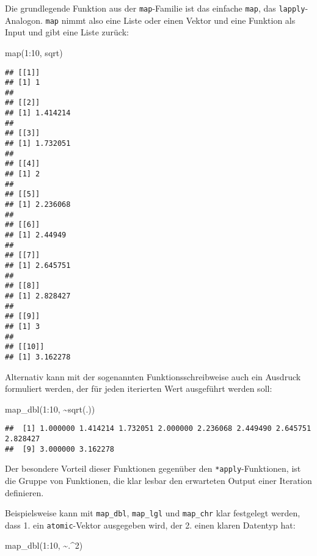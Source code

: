 \documentclass[
]{book}
\newenvironment{Shaded}{\begin{snugshade}}{\end{snugshade}}
\newcommand{\DecValTok}[1]{\textcolor[rgb]{0.00,0.00,0.81}{#1}}
\newcommand{\FunctionTok}[1]{\textcolor[rgb]{0.00,0.00,0.00}{#1}}
\newcommand{\NormalTok}[1]{#1}
\newcommand{\SpecialCharTok}[1]{\textcolor[rgb]{0.00,0.00,0.00}{#1}}
\begin{document}
Die grundlegende Funktion aus der \texttt{map}-Familie ist das einfache \texttt{map}, das \texttt{lapply}-Analogon. \texttt{map} nimmt also eine Liste oder einen Vektor und eine Funktion als Input und gibt eine Liste zurück:

\begin{Shaded}
\begin{Highlighting}[]
\FunctionTok{map}\NormalTok{(}\DecValTok{1}\SpecialCharTok{:}\DecValTok{10}\NormalTok{, sqrt)}
\end{Highlighting}
\end{Shaded}

\begin{verbatim}
## [[1]]
## [1] 1
## 
## [[2]]
## [1] 1.414214
## 
## [[3]]
## [1] 1.732051
## 
## [[4]]
## [1] 2
## 
## [[5]]
## [1] 2.236068
## 
## [[6]]
## [1] 2.44949
## 
## [[7]]
## [1] 2.645751
## 
## [[8]]
## [1] 2.828427
## 
## [[9]]
## [1] 3
## 
## [[10]]
## [1] 3.162278
\end{verbatim}

Alternativ kann mit der sogenannten Funktionsschreibweise auch ein Ausdruck formuliert werden, der für jeden iterierten Wert ausgeführt werden soll:

\begin{Shaded}
\begin{Highlighting}[]
\FunctionTok{map\_dbl}\NormalTok{(}\DecValTok{1}\SpecialCharTok{:}\DecValTok{10}\NormalTok{, }\SpecialCharTok{\textasciitilde{}}\FunctionTok{sqrt}\NormalTok{(.))}
\end{Highlighting}
\end{Shaded}

\begin{verbatim}
##  [1] 1.000000 1.414214 1.732051 2.000000 2.236068 2.449490 2.645751 2.828427
##  [9] 3.000000 3.162278
\end{verbatim}

Der besondere Vorteil dieser Funktionen gegenüber den \texttt{*apply}-Funktionen, ist die Gruppe von Funktionen, die klar lesbar den erwarteten Output einer Iteration definieren.

Beispielsweise kann mit \texttt{map\_dbl}, \texttt{map\_lgl} und \texttt{map\_chr} klar festgelegt werden, dass 1. ein \texttt{atomic}-Vektor ausgegeben wird, der 2. einen klaren Datentyp hat:

\begin{Shaded}
\begin{Highlighting}[]
\FunctionTok{map\_dbl}\NormalTok{(}\DecValTok{1}\SpecialCharTok{:}\DecValTok{10}\NormalTok{, }\SpecialCharTok{\textasciitilde{}}\NormalTok{.}\SpecialCharTok{\^{}}\DecValTok{2}\NormalTok{)}
\end{Highlighting}
\end{Shaded}
\end{document}
